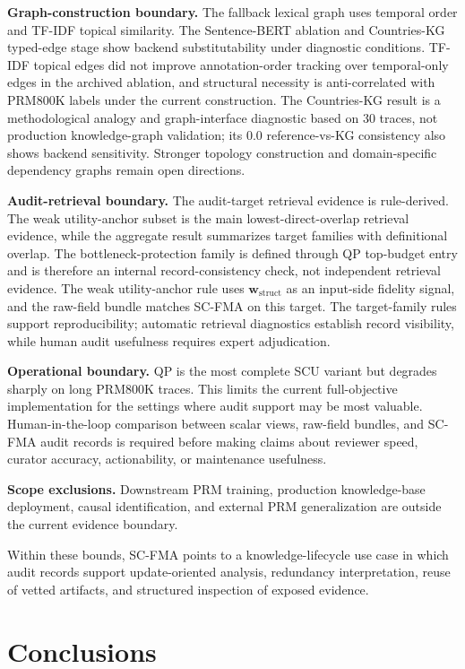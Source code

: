 \documentclass[a4paper,fleqn]{cas-sc}
\newcommand{\wstruct}{\ensuremath{\mathbf{w}_{\mathrm{struct}}}}
\begin{document}
\textbf{Graph-construction boundary.} The fallback lexical graph uses temporal order and TF-IDF topical similarity. The Sentence-BERT ablation and Countries-KG typed-edge stage show backend substitutability under diagnostic conditions. TF-IDF topical edges did not improve annotation-order tracking over temporal-only edges in the archived ablation, and structural necessity is anti-correlated with PRM800K labels under the current construction. The Countries-KG result is a methodological analogy and graph-interface diagnostic based on 30 traces, not production knowledge-graph validation; its 0.0 reference-vs-KG consistency also shows backend sensitivity. Stronger topology construction and domain-specific dependency graphs remain open directions.

\textbf{Audit-retrieval boundary.} The audit-target retrieval evidence is rule-derived. The weak utility-anchor subset is the main lowest-direct-overlap retrieval evidence, while the aggregate result summarizes target families with definitional overlap. The bottleneck-protection family is defined through QP top-budget entry and is therefore an internal record-consistency check, not independent retrieval evidence. The weak utility-anchor rule uses \wstruct{} as an input-side fidelity signal, and the raw-field bundle matches SC-FMA on this target. The target-family rules support reproducibility; automatic retrieval diagnostics establish record visibility, while human audit usefulness requires expert adjudication.

\textbf{Operational boundary.} QP is the most complete SCU variant but degrades sharply on long PRM800K traces. This limits the current full-objective implementation for the settings where audit support may be most valuable. Human-in-the-loop comparison between scalar views, raw-field bundles, and SC-FMA audit records is required before making claims about reviewer speed, curator accuracy, actionability, or maintenance usefulness.

\medskip
\noindent\textbf{Scope exclusions.} Downstream PRM training, production knowledge-base deployment, causal identification, and external PRM generalization are outside the current evidence boundary.

\noindent Within these bounds, SC-FMA points to a knowledge-lifecycle use case in which audit records support update-oriented analysis, redundancy interpretation, reuse of vetted artifacts, and structured inspection of exposed evidence.

\section{Conclusions}
\label{sec:conclusions}
\end{document}
